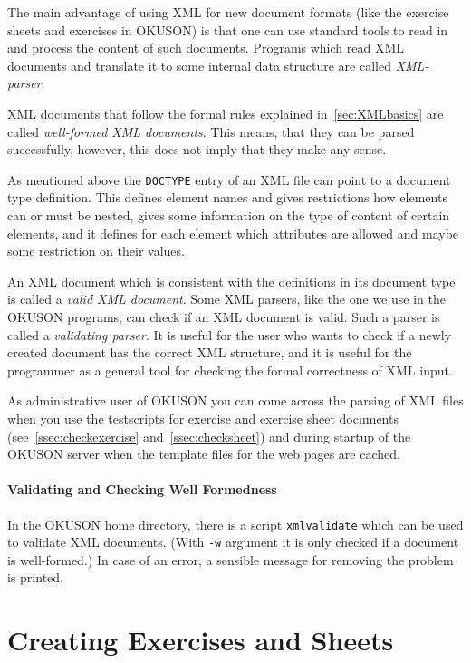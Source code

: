 \documentclass[12pt,openany,a4paper]{book}
\newcommand{\OKUSON}{\textsf{OKUSON}}
\begin{document}
The main advantage of using  XML for new document formats (like the exercise
sheets and exercises in \OKUSON) is that one can use standard tools to read
in and process the content of such documents. Programs which read  XML
documents  and translate it to some internal data structure are called
\emph{XML-parser}. 

XML documents that follow the formal rules explained 
in~\ref{sec:XMLbasics} 
are called \emph{well-formed XML documents}. This means, that they can
be parsed successfully, however, this does not imply
that they make any sense. 

As mentioned above the \texttt{DOCTYPE} entry of an XML file can point to a
document type definition. This defines element  names and gives restrictions
how elements can or must be nested, gives some information on the type of
content of certain elements, and it  defines for each element which
attributes are allowed and maybe some restriction on their values.

An XML  document which is  consistent with  the definitions in  its document
type is called  a \emph{valid XML document}. Some XML  parsers, like the one
we use  in the {\OKUSON}  programs, can check if  an XML document  is valid.
Such a parser is called a \emph{validating parser}. It is useful 
for the user who wants to check if a newly created document has the correct XML
structure, and it is useful for the programmer as a general tool for checking
the formal correctness of XML input.

As administrative user  of {\OKUSON} you can come across  the parsing of XML
files when you use the testscripts for exercise and exercise sheet documents
(see~\ref{ssec:checkexercise} and~\ref{ssec:checksheet}) and during startup
of the {\OKUSON} server when the template files for the web pages are
cached.

\subsubsection*{Validating and Checking Well Formedness}

In the {\OKUSON} home directory, there is a script \texttt{xmlvalidate}
which can be used to validate XML documents. (With \texttt{-w} argument it
is only checked if a document is well-formed.) In case of an error, a
sensible message for removing the problem is printed.

\chapter{Creating Exercises and Sheets}\label{ch:createExercisesSheets}
\end{document}
